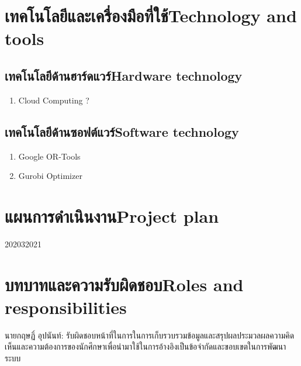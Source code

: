 \section{\ifcpe เทคโนโลยีและเครื่องมือที่ใช้\else Technology and tools\fi}

\subsection{\ifcpe เทคโนโลยีด้านฮาร์ดแวร์\else Hardware technology\fi}
\begin{enumerate}
    \item Cloud Computing ?
\end{enumerate}
\subsection{\ifcpe เทคโนโลยีด้านซอฟต์แวร์\else Software technology\fi}
\begin{enumerate}
    \item Google OR-Tools
    \item Gurobi Optimizer
\end{enumerate}

\section{\ifcpe แผนการดำเนินงาน\else Project plan\fi}

\begin{plan}{7}{2020}{3}{2021}
\end{plan}

\section{\ifcpe บทบาทและความรับผิดชอบ\else Roles and responsibilities\fi}
นายกฤษฏิ์ อุปนันท์: รับผิดชอบหน้าที่ในการในการเก็บรวบรวมข้อมูลและสรุปผลประมวลผลความคิดเห็นและความต้องการของนักศึกษาเพื่อนำมาใช้ในการอ้างอิงเป็นข้อจำกัดและขอบเขตในการพัฒนาระบบ
\linebreak

